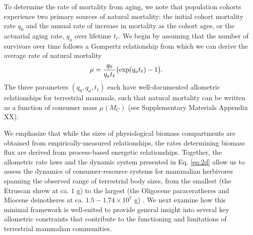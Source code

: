 \documentclass[]{rsos}%
\begin{document}
To determine the rate of mortality from aging, we note that population cohorts experience two primary sources of natural mortality: the initial cohort mortality rate $q_0$ and the annual rate of increase in mortality as the cohort ages, or the actuarial aging rate, $q_a$ over lifetime $t_\ell$.
We begin by assuming that the number of survivors over time follows a Gompertz relationship \cite{CalderIII:1983jd,yeakel2018dynamics} from which we can derive the average rate of natural mortality 
\begin{equation}
    \mu = \frac{q_0}{q_a t_\ell}\big({\rm exp}(q_a t_\ell)-1\big).
\end{equation}
The three parameters $(q_0,q_a,t_\ell)$ each have well-documented allometric relationships for terrestrial mammals, such that natural mortality can be written as a function of consumer mass $\mu(M_C)$ (see Supplementary Materials Appendix XX).


We emphasize that while the sizes of physiological biomass compartments are obtained from empirically-measured relationships, the rates determining biomass flux are derived from process-based energetic relationships.
Together, the allometric rate laws and the dynamic system presented in Eq. \ref{eq:2d} allow us to assess the dynamics of consumer-resource systems for mammalian herbivores spanning the observed range of terrestrial body sizes, from the smallest (the Etruscan shrew at ca. $1$ g) to the largest (the Oligocene paraceratheres and Miocene deinotheres at ca. $1.5-1.74\times10^7$ g) \cite{Smith:2010p3442}.
We next examine how this minimal framework is well-suited to provide general insight into several key allometric constraints that contribute to the functioning and limitations of terrestrial mammalian communities.






\end{document}
